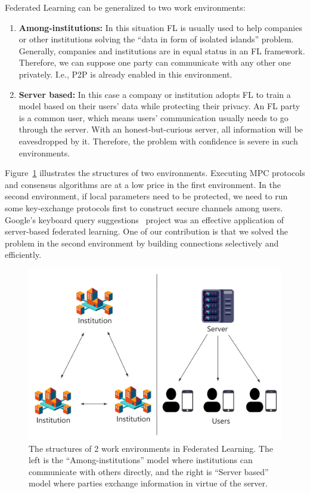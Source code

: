 Federated Learning can be generalized to two work environments:

\begin{enumerate}

    \item \textbf{Among-institutions:} In this situation FL is usually used to help companies or other institutions solving the ``data in form of isolated islands'' problem. Generally, companies and institutions are in equal status in an FL framework. Therefore, we can suppose one party can communicate with any other one privately. I.e., P2P is already enabled in this environment.

    \item \textbf{Server based:} In this case a company or institution adopts FL to train a model based on their users' data while protecting their privacy. An FL party is a common user, which means users' communication usually needs to go through the server. With an honest-but-curious server, all information will be eavesdropped by it. Therefore, the problem with confidence is severe in such environments.

\end{enumerate}

Figure~\ref{fl_model} illustrates the structures of two environments. Executing MPC protocols and consensus algorithms are at a low price in the first environment. In the second environment, if local parameters need to be protected, we need to run some key-exchange protocols first to construct secure channels among users. Google's keyboard query suggestions~\cite{yang2018applied} project was an effective application of server-based federated learning. One of our contribution is that we solved the problem in the second environment by building connections selectively and efficiently.


\begin{figure}[!ht]
    \centering
    \includegraphics[width=\columnwidth]{img/fl_model.png}
    \caption{The structures of 2 work environments in Federated Learning. The left is the ``Among-institutions'' model where institutions can communicate with others directly, and the right is ``Server based'' model where parties exchange information in virtue of the server.}
    \label{fl_model}
\end{figure}



